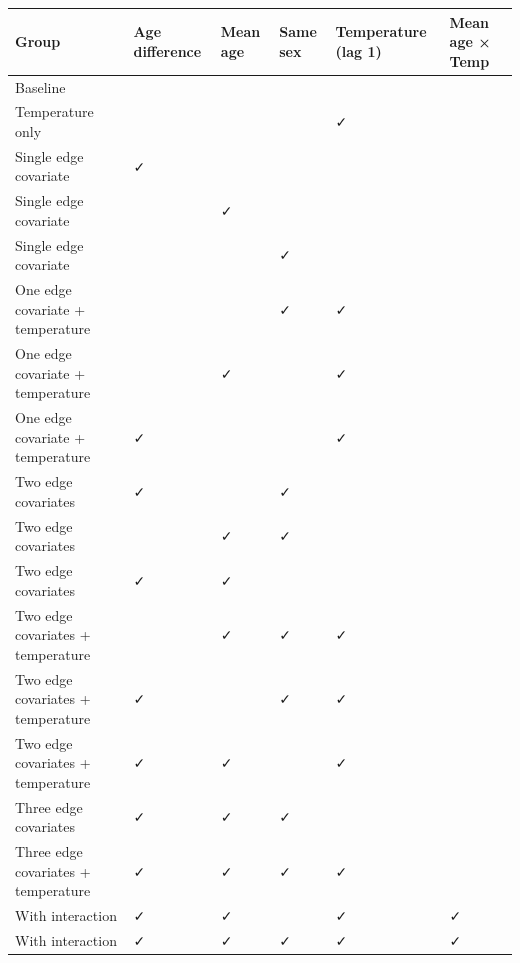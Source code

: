 \begin{tabular}{llllll}
\toprule
Group & Age difference & Mean age & Same sex & Temperature (lag 1) & Mean age × Temp \\
\midrule
Baseline &  &  &  &  &  \\
Temperature only &  &  &  & ✓ &  \\
Single edge covariate & ✓ &  &  &  &  \\
Single edge covariate &  & ✓ &  &  &  \\
Single edge covariate &  &  & ✓ &  &  \\
One edge covariate + temperature &  &  & ✓ & ✓ &  \\
One edge covariate + temperature &  & ✓ &  & ✓ &  \\
One edge covariate + temperature & ✓ &  &  & ✓ &  \\
Two edge covariates & ✓ &  & ✓ &  &  \\
Two edge covariates &  & ✓ & ✓ &  &  \\
Two edge covariates & ✓ & ✓ &  &  &  \\
Two edge covariates + temperature &  & ✓ & ✓ & ✓ &  \\
Two edge covariates + temperature & ✓ &  & ✓ & ✓ &  \\
Two edge covariates + temperature & ✓ & ✓ &  & ✓ &  \\
Three edge covariates & ✓ & ✓ & ✓ &  &  \\
Three edge covariates + temperature & ✓ & ✓ & ✓ & ✓ &  \\
With interaction & ✓ & ✓ &  & ✓ & ✓ \\
With interaction & ✓ & ✓ & ✓ & ✓ & ✓ \\
\bottomrule
\end{tabular}
